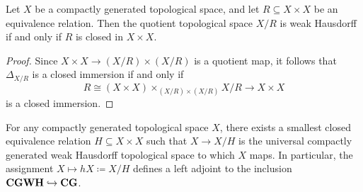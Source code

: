 \begin{lem}
	Let $ X $ be a compactly generated topological space, and let $ R \subseteq X \times X $ be an equivalence relation.
	Then the quotient topological space $ X/R $ is weak Hausdorff if and only if $ R $ is closed in $ X \times X $.
\end{lem}

\begin{proof}
	Since $ X \times X \to (X/R) \times (X/R) $ is a quotient map, it follows that $ \Delta_{X/R} $ is a closed immersion if and only if
	\[
		R \cong (X \times X) \times_{(X/R) \times (X/R)} X/R \to X \times X
	\]
	is a closed immersion.
\end{proof}

\begin{cor}
	For any compactly generated topological space $ X $, there exists a smallest closed equivalence relation $ H \subseteq X \times X $ such that $ X \to X/H $ is the universal compactly generated weak Hausdorff topological space to which $ X $ maps.
	In particular, the assignment $ X \mapsto hX \coloneq X/H $ defines a left adjoint to the inclusion $ \textbf{\textup{CGWH}} \hookrightarrow \textbf{\textup{CG}} $.
\end{cor}





